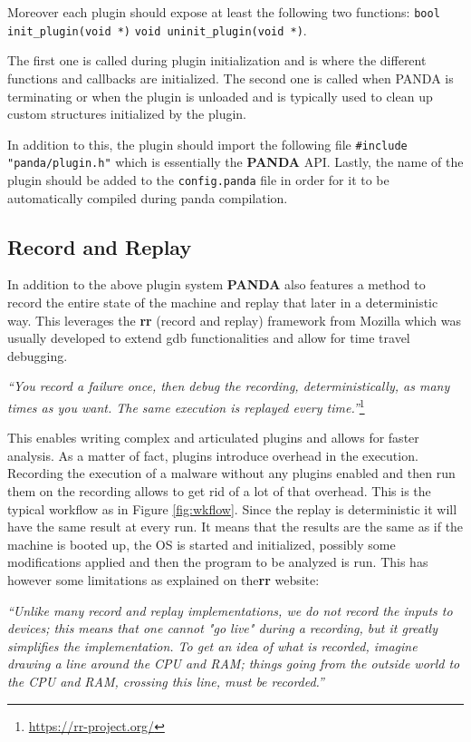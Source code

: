 Moreover each plugin should expose at least the following two functions: \lstinline{bool init_plugin(void *)} \lstinline{void uninit_plugin(void *)}.

The first one is called during plugin initialization and is where the different functions and callbacks are initialized. The second one is called when PANDA is terminating or when the plugin is unloaded and is typically used to clean up custom structures initialized by the plugin.

In addition to this, the plugin should import the following file \lstinline{#include "panda/plugin.h"} which is essentially the \textbf{PANDA} API. Lastly, the name of the plugin should be added to the \lstinline{config.panda} file in order for it to be automatically compiled during panda compilation.


\subsection{Record and Replay}

In addition to the above plugin system \textbf{PANDA} also features a method to record the entire state of the machine and replay that later in a deterministic way. This leverages the \textbf{rr} (record and replay) framework from Mozilla which was usually developed to extend gdb functionalities and allow for time travel debugging. 

\textit{``You record a failure once, then debug the recording, deterministically, as many times as you want. The same execution is replayed every time.''}\footnote{\url{https://rr-project.org/}}

This enables writing complex and articulated plugins and allows for faster analysis. As a matter of fact, plugins introduce overhead in the execution. Recording the execution of a malware without any plugins enabled and then run them on the recording allows to get rid of a lot of that overhead. This is the typical workflow as in Figure \ref{fig:wkflow}. Since the replay is deterministic it will have the same result at every run. It means that the results are the same as if the machine is booted up, the OS is started and initialized, possibly some modifications applied and then the program to be analyzed is run. This has however some limitations as explained on the\textbf{rr} website: 

\textit{``Unlike many record and replay implementations, we do not record the inputs to devices; this means that one cannot "go live" during a recording, but it greatly simplifies the implementation. To get an idea of what is recorded, imagine drawing a line around the CPU and RAM; things going from the outside world to the CPU and RAM, crossing this line, must be recorded.''}


